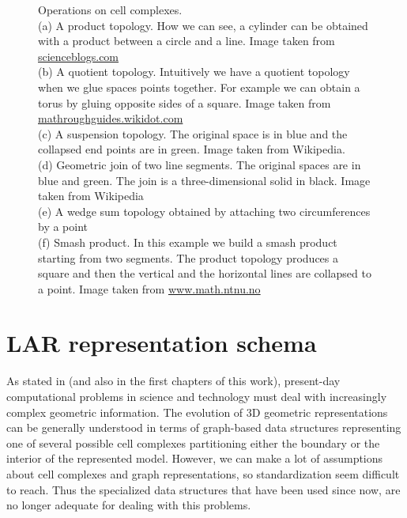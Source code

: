 \begin{figure}[htbp]
   \caption[Operations on cell complexes]{Operations on cell complexes.\\ (a) A product topology. How we can see, a cylinder can be obtained with a product between a circle and a line. Image taken from \href{http://scienceblogs.com/goodmath/2006/09/21/topological-products/}{scienceblogs.com}\\ (b) A quotient topology. Intuitively we have a quotient topology when we glue spaces points together. For example we can obtain a torus by gluing opposite sides of a square. Image taken from \href{http://mathroughguides.wikidot.com/article:point-set-topology}{mathroughguides.wikidot.com}\\ (c) A suspension topology. The original space is in blue and the collapsed end points are in green. Image taken from Wikipedia.\\ (d) Geometric join of two line segments. The original spaces are in blue and green. The join is a three-dimensional solid in black. Image taken from Wikipedia\\ (e) A wedge sum topology obtained by attaching two circumferences by a point\\ (f) Smash product. In this example we build a smash product starting from two segments. The product topology produces a square and then the vertical and the horizontal lines are collapsed to a point. Image taken from \href{http://www.math.ntnu.no/~stacey/Seminars/chern.html}{www.math.ntnu.no}}
   \label{fig:cellOperations}
\end{figure}

\section{LAR representation schema}\label{sec21:LAR}

As stated in \cite{DiCarlo} (and also in the first chapters of this work), present-day computational problems in science and technology must deal with increasingly complex geometric information. The evolution of 3D geometric representations can be generally understood in terms of graph-based data structures representing one of several possible cell complexes partitioning either the boundary or the interior of the represented model. However, we can make a lot of assumptions about cell complexes and graph representations, so standardization seem difficult to reach. Thus the specialized data structures that have been used since now, are no longer adequate for dealing with this problems.\\

